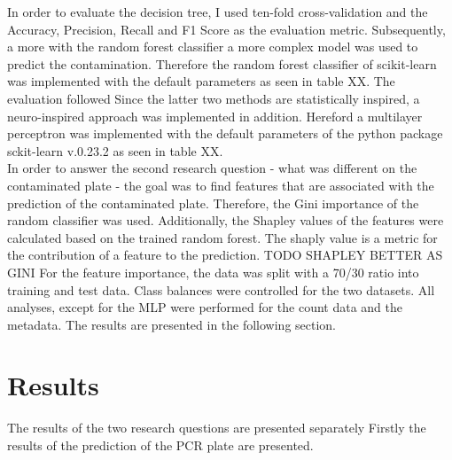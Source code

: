 \documentclass{svproc}
\begin{document}
In order to evaluate the decision tree, I used ten-fold cross-validation and the Accuracy, Precision, Recall and F1 Score as the evaluation metric.
Subsequently, a more with the random forest classifier a more complex model was used to predict the contamination. Therefore the random forest classifier of scikit-learn was implemented with the default parameters as seen in table XX. The evaluation followed
Since the latter two methods are statistically inspired, a neuro-inspired approach was implemented in addition. Hereford a multilayer perceptron was implemented with the default parameters of the python package sckit-learn v.0.23.2 as seen in table XX.\\

In order to answer the second research question - what was different on the contaminated plate - the goal was to find features that are associated with the prediction of the contaminated plate. Therefore, the Gini importance of the random classifier was used. Additionally, the Shapley values of the features were calculated based on the trained random forest. The shaply value is a metric for the contribution of a feature to the prediction. TODO SHAPLEY BETTER AS GINI For the feature importance, the data was split with a 70/30 ratio into training and test data. Class balances were controlled for the two datasets. All analyses, except for the MLP were performed for the count data and the metadata. The results are presented in the following section.
\section{Results}
The results of the two research questions are presented separately Firstly the results of the prediction of the PCR plate are presented.
\end{document}
